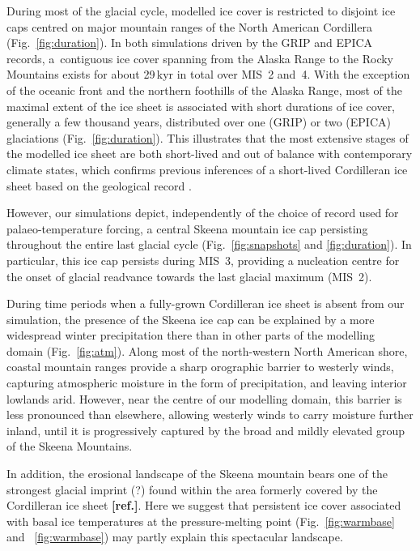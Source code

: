 \documentclass[tc, manuscript]{copernicus}
\newcommand{\aref}[0]{\textbf{[ref.]}}
\begin{document}
During most of the glacial cycle, modelled ice cover is restricted to disjoint
ice caps centred on major mountain ranges of the North American Cordillera
(Fig.~\ref{fig:duration}). In both simulations driven by the GRIP and EPICA
records, a~contiguous ice cover spanning from the Alaska Range to the Rocky
Mountains exists for about 29\,kyr in total over MIS~2 and~4.
With the exception of the oceanic front and the northern foothills of the Alaska
Range, most of the maximal extent of the ice sheet is associated with short
durations of ice cover, generally a few thousand years, distributed over one
(GRIP) or two (EPICA) glaciations (Fig.~\ref{fig:duration}). This illustrates
that the most extensive stages of the modelled ice sheet are both short-lived
and out of balance with contemporary climate states, which confirms previous
inferences of a short-lived Cordilleran ice sheet based on the geological
record \citep{Clague.etal.1980, Stroeven.etal.2010}.

However, our simulations depict, independently of the choice of record used for
palaeo-temperature forcing, a central Skeena mountain ice cap persisting
throughout the entire last glacial cycle (Fig.~\ref{fig:snapshots} and
\ref{fig:duration}). In particular, this ice cap persists during MIS~3,
providing a nucleation centre for the onset of glacial
readvance towards the last glacial maximum (MIS~2).

During time periods when a fully-grown Cordilleran ice sheet is absent from our
simulation, the presence of the Skeena ice cap can be explained by a more
widespread winter precipitation there than in other parts of the modelling
domain (Fig.~\ref{fig:atm}). Along most of the north-western North American
shore, coastal mountain ranges provide a sharp orographic barrier to westerly
winds, capturing atmospheric moisture in the form of precipitation, and leaving
interior lowlands arid. However, near the centre of our modelling domain, this
barrier is less pronounced than
elsewhere, allowing westerly winds to carry moisture further inland, until it
is progressively captured by the broad and mildly elevated group of the Skeena
Mountains.

In addition, the erosional landscape of the Skeena mountain bears one of the
strongest glacial imprint (?) found within the area formerly covered by the
Cordilleran ice sheet \aref. Here we suggest that persistent ice cover
associated with basal ice temperatures at the pressure-melting point
(Fig.~\ref{fig:warmbase} and ~\ref{fig:warmbase}) may partly explain this
spectacular landscape.
\end{document}
